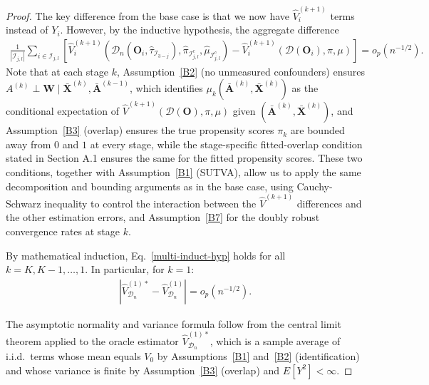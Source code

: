 \documentclass[11pt]{article}
\theoremstyle{referenceplain}
\theoremstyle{referencedefinition}
\theoremstyle{referenceremark}
\begin{document}
\begin{proof}
The key difference from the base case is that we now have $\widehat{V}_i^{(k+1)}$ terms instead of $Y_i$. However, by the inductive hypothesis, the aggregate difference
\begin{align}
    \frac{1}{|\mathcal{I}_{j,l}|}\sum_{i\in\mathcal{I}_{j,l}}\left[\widehat{V}_i^{(k+1)}(\mathcal{D}_n(\mathbf{O}_i,\widehat{\tau}_{\mathcal{I}_{3-j}}),\widehat{\pi}_{\mathcal{I}_{j,l}^c},\widehat{\mu}_{\mathcal{I}_{j,l}^c}) - \widehat{V}_i^{(k+1)}(\mathcal{D}(\mathbf{O}_i),\pi,\mu)\right] = o_p(n^{-1/2}).
\end{align}
Note that at each stage $k$, Assumption~\ref{B2} (no unmeasured confounders) ensures $A^{(k)} \perp \mathbf{W} \mid \bar{\mathbf{X}}^{(k)}, \bar{\mathbf{A}}^{(k-1)}$, which identifies $\mu_k(\bar{\mathbf{A}}^{(k)}, \bar{\mathbf{X}}^{(k)})$ as the conditional expectation of $\widehat{V}^{(k+1)}(\mathcal{D}(\mathbf{O}),\pi,\mu)$ given $(\bar{\mathbf{A}}^{(k)}, \bar{\mathbf{X}}^{(k)})$, and Assumption~\ref{B3} (overlap) ensures the {true} propensity scores $\pi_k$ are bounded away from $0$ and $1$ at every stage{, while the stage-specific fitted-overlap condition stated in Section A.1 ensures the same for the fitted propensity scores}. These two conditions, together with Assumption~\ref{B1} (SUTVA), allow us to apply the same decomposition and bounding arguments as in the base case, using Cauchy-Schwarz inequality to control the interaction between the $\widehat{V}^{(k+1)}$ differences and the other estimation errors, and Assumption~\ref{B7} for the doubly robust convergence rates at stage $k$.

By mathematical induction, Eq.~\eqref{multi-induct-hyp} holds for all $k = K, K-1, \ldots, 1$. In particular, for $k = 1$:
\begin{align}
    |\widehat{V}_{\mathcal{D}_n}^{(1)*} - \widehat{V}_{\mathcal{D}_n}^{(1)}| = o_p(n^{-1/2}).
\end{align}

The asymptotic normality and variance formula follow from the central limit theorem applied to the oracle estimator $\widehat{V}_{\mathcal{D}_n}^{(1)*}$, which is a sample average of i.i.d.\ terms whose mean equals $V_0$ by Assumptions~\ref{B1} and~\ref{B2} (identification) and whose variance is finite by Assumption~\ref{B3} (overlap) and $E[Y^2]<\infty$.
\end{proof}
\end{document}
